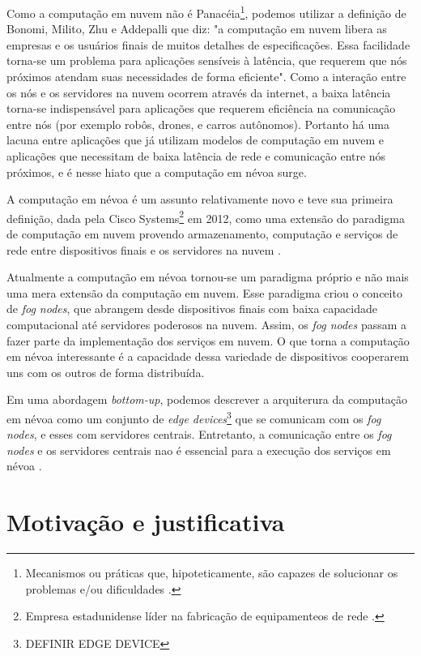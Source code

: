 Como a computação em nuvem não é Panacéia\footnote{Mecanismos ou práticas que, hipoteticamente, são capazes de solucionar os problemas e/ou dificuldades \cite{definition:panaceia}.}, podemos utilizar a definição de  Bonomi, Milito, Zhu e Addepalli \cite{Bonomi:2012} que diz: "a computação em nuvem libera as empresas e os usuários finais de muitos detalhes de especificações.
Essa facilidade torna-se um problema para aplicações sensíveis à latência, que requerem que nós próximos atendam suas necessidades de forma eficiente". 
Como a interação entre os nós e os servidores na nuvem ocorrem através da internet, a baixa latência torna-se indispensável para aplicações que requerem eficiência na comunicação entre nós (por exemplo robôs, drones, e carros autônomos).
Portanto há uma lacuna entre aplicações que já utilizam modelos de computação em nuvem e aplicações que necessitam de baixa latência de rede e comunicação entre nós próximos, e é nesse hiato que a computação em névoa surge.

A computação em névoa é um assunto relativamente novo e teve sua primeira definição, dada pela Cisco Systems\footnote{Empresa estadunidense líder na fabricação de equipamenteos de rede \cite{ciscoSystems}.} em 2012, como uma extensão do paradigma de computação em nuvem provendo armazenamento, computação e serviços de rede entre dispositivos finais e os servidores na nuvem \cite{DBLP:journals/corr/RomanLM16}. 

Atualmente a computação em névoa tornou-se um paradigma próprio e não mais uma mera extensão da computação em nuvem.
Esse paradigma criou o conceito de \textit{fog nodes}, que abrangem desde dispositivos finais com baixa capacidade computacional até servidores poderosos na nuvem.
Assim, os \textit{fog nodes} passam a fazer parte da implementação dos serviços em nuvem.
O que torna a computação em névoa interessante é a capacidade dessa variedade de dispositivos cooperarem uns com os outros de forma distribuída.

Em uma abordagem \textit{bottom-up}, podemos descrever a arquiterura da computação em névoa como um conjunto de \textit{edge devices}\footnote{DEFINIR EDGE DEVICE} que se comunicam com os \textit{fog nodes}, e esses com servidores centrais.
Entretanto, a comunicação entre os \textit{fog nodes} e os servidores centrais nao é essencial para a execução dos serviços em névoa \cite{DBLP:journals/corr/RomanLM16}.


\section{Motivação e justificativa}

